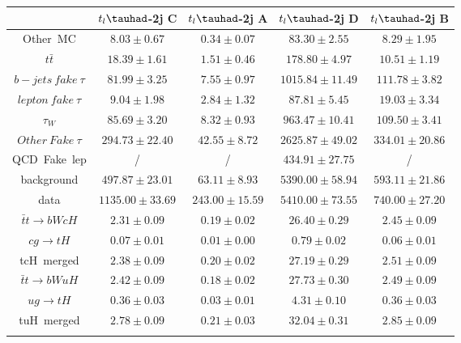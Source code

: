 \centering
\begin{tabular}{ccccc} \toprule\toprule
 & $t_{l}\tauhad$-2j C & $t_{l}\tauhad$-2j A & $t_{l}\tauhad$-2j D & $t_{l}\tauhad$-2j B\\\midrule
Other~MC & $8.03\pm0.67$ & $0.34\pm0.07$ & $83.30\pm2.55$ & $8.29\pm1.95$\\
$t\bar{t}$ & $18.39\pm1.61$ & $1.51\pm0.46$ & $178.80\pm4.97$ & $10.51\pm1.19$\\
$b-jets~fake~\tau$ & $81.99\pm3.25$ & $7.55\pm0.97$ & $1015.84\pm11.49$ & $111.78\pm3.82$\\
$lepton~fake~\tau$ & $9.04\pm1.98$ & $2.84\pm1.32$ & $87.81\pm5.45$ & $19.03\pm3.34$\\
$\tau_{W}$ & $85.69\pm3.20$ & $8.32\pm0.93$ & $963.47\pm10.41$ & $109.50\pm3.41$\\
$Other~Fake~\tau$ & $294.73\pm22.40$ & $42.55\pm8.72$ & $2625.87\pm49.02$ & $334.01\pm20.86$\\
QCD~Fake~lep &  / &  / & $434.91\pm27.75$ &  /\\
background & $497.87\pm23.01$ & $63.11\pm8.93$ & $5390.00\pm58.94$ & $593.11\pm21.86$\\
data & $1135.00\pm33.69$ & $243.00\pm15.59$ & $5410.00\pm73.55$ & $740.00\pm27.20$\\
$\bar{t}t\to bWcH$ & $2.31\pm0.09$ & $0.19\pm0.02$ & $26.40\pm0.29$ & $2.45\pm0.09$\\
$cg\to tH$ & $0.07\pm0.01$ & $0.01\pm0.00$ & $0.79\pm0.02$ & $0.06\pm0.01$\\
tcH~merged & $2.38\pm0.09$ & $0.20\pm0.02$ & $27.19\pm0.29$ & $2.51\pm0.09$\\
$\bar{t}t\to bWuH$ & $2.42\pm0.09$ & $0.18\pm0.02$ & $27.73\pm0.30$ & $2.49\pm0.09$\\
$ug\to tH$ & $0.36\pm0.03$ & $0.03\pm0.01$ & $4.31\pm0.10$ & $0.36\pm0.03$\\
tuH~merged & $2.78\pm0.09$ & $0.21\pm0.03$ & $32.04\pm0.31$ & $2.85\pm0.09$\\
\bottomrule\bottomrule\\
\end{tabular}
